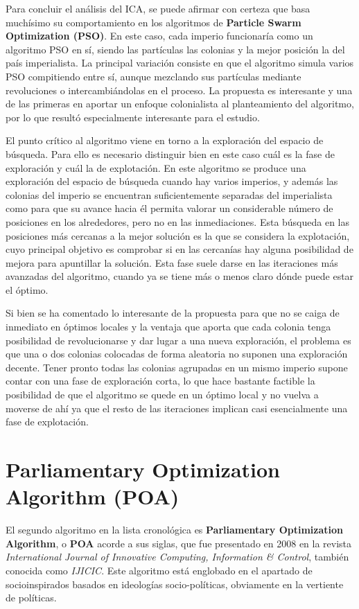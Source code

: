 Para concluir el análisis del ICA, se puede afirmar con certeza que basa muchísimo su comportamiento en los algoritmos de \textbf{Particle Swarm Optimization (PSO)}. En este caso, cada imperio funcionaría como un algoritmo PSO en sí, siendo las partículas las colonias y la mejor posición la del país imperialista. La principal variación consiste en que el algoritmo simula varios PSO compitiendo entre sí, aunque mezclando sus partículas mediante revoluciones o intercambiándolas en el proceso. La propuesta es interesante y una de las primeras en aportar un enfoque colonialista al planteamiento del algoritmo, por lo que resultó especialmente interesante para el estudio.

El punto crítico al algoritmo viene en torno a la exploración del espacio de búsqueda. Para ello es necesario distinguir bien en este caso cuál es la fase de exploración y cuál la de explotación. En este algoritmo se produce una exploración del espacio de búsqueda cuando hay varios imperios, y además las colonias del imperio se encuentran suficientemente separadas del imperialista como para que su avance hacia él permita valorar un considerable número de posiciones en los alrededores, pero no en las inmediaciones. Esta búsqueda en las posiciones más cercanas a la mejor solución es la que se considera la explotación, cuyo principal objetivo es comprobar si en las cercanías hay alguna posibilidad de mejora para apuntillar la solución. Esta fase suele darse en las iteraciones más avanzadas del algoritmo, cuando ya se tiene más o menos claro dónde puede estar el óptimo.

Si bien se ha comentado lo interesante de la propuesta para que no se caiga de inmediato en óptimos locales y la ventaja que aporta que cada colonia tenga posibilidad de revolucionarse y dar lugar a una nueva exploración, el problema es que una o dos colonias colocadas de forma aleatoria no suponen una exploración decente. Tener pronto todas las colonias agrupadas en un mismo imperio supone contar con una fase de exploración corta, lo que hace bastante factible la posibilidad de que el algoritmo se quede en un óptimo local y no vuelva a moverse de ahí ya que el resto de las iteraciones implican casi esencialmente una fase de explotación.

\section{Parliamentary Optimization Algorithm (POA)}

El segundo algoritmo en la lista cronológica es \textbf{Parliamentary Optimization Algorithm}, o \textbf{POA} acorde a sus siglas, que fue presentado en 2008 \cite{poa-article} en la revista \textit{International Journal of Innovative Computing, Information \& Control}, también conocida como \textit{IJICIC}. Este algoritmo está englobado en el apartado de socioinspirados basados en ideologías socio-políticas, obviamente en la vertiente de políticas.

